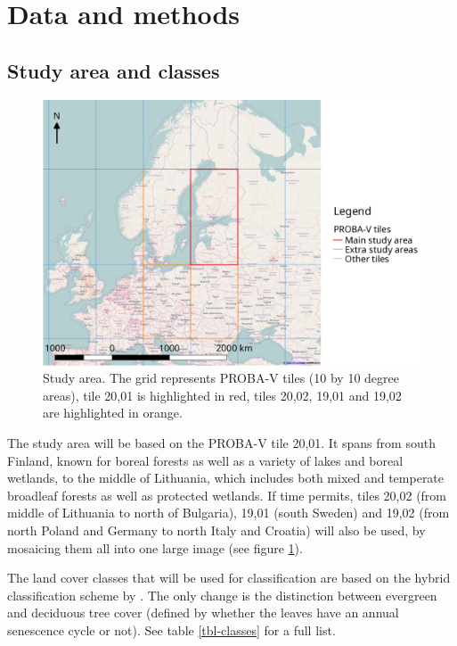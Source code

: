 \documentclass[a4paper,10pt]{book}
\begin{document}
\section{Data and methods}

\subsection{Study area and classes}

\begin{figure}
 \includegraphics[width=\textwidth]{./proposal-figures/studyarea.png}
 \caption{Study area. The grid represents PROBA-V tiles (10 by 10 degree areas), tile 20,01 is highlighted in red, tiles 20,02, 19,01 and 19,02 are highlighted in orange.}
 \label{AOI}
\end{figure} 

The study area will be based on the PROBA-V tile 20,01. It spans from south Finland, known for boreal forests as well as a variety of lakes and boreal wetlands, to the middle of Lithuania, which includes both mixed and temperate broadleaf forests as well as protected wetlands. If time permits, tiles 20,02 (from middle of Lithuania to north of Bulgaria), 19,01 (south Sweden) and 19,02 (from north Poland and Germany to north Italy and Croatia) will also be used, by mosaicing them all into one large image (see figure \ref{AOI}).

The land cover classes that will be used for classification are based on the hybrid classification scheme by \citep{see2015hybrid}. The only change is the distinction between evergreen and deciduous tree cover (defined by whether the leaves have an annual senescence cycle or not). See table \ref{tbl-classes} for a full list.
\end{document}
